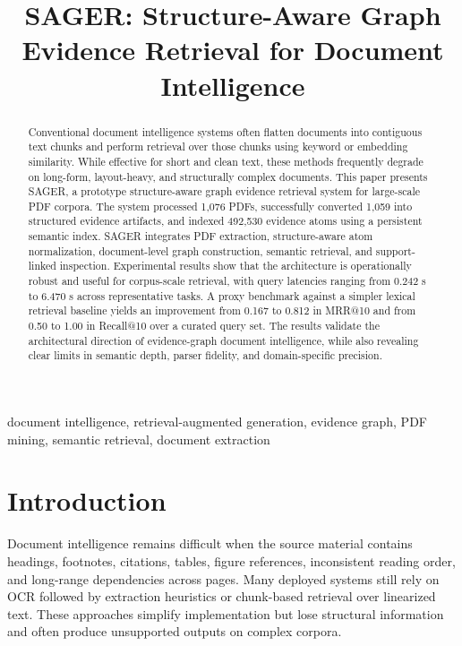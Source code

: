 \documentclass[conference]{IEEEtran}
\title{SAGER: Structure-Aware Graph Evidence Retrieval for Document Intelligence}
\author{
\IEEEauthorblockN{Meet Jethwa}
\IEEEauthorblockA{Independent Research / DocIntelligence Prototype\\
India\\
Email: meetjethwa3@gmail.com}
}
\begin{document}
\maketitle

\begin{abstract}
Conventional document intelligence systems often flatten documents into contiguous text chunks and perform retrieval over those chunks using keyword or embedding similarity. While effective for short and clean text, these methods frequently degrade on long-form, layout-heavy, and structurally complex documents. This paper presents SAGER, a prototype structure-aware graph evidence retrieval system for large-scale PDF corpora. The system processed 1,076 PDFs, successfully converted 1,059 into structured evidence artifacts, and indexed 492,530 evidence atoms using a persistent semantic index. SAGER integrates PDF extraction, structure-aware atom normalization, document-level graph construction, semantic retrieval, and support-linked inspection. Experimental results show that the architecture is operationally robust and useful for corpus-scale retrieval, with query latencies ranging from 0.242 s to 6.470 s across representative tasks. A proxy benchmark against a simpler lexical retrieval baseline yields an improvement from 0.167 to 0.812 in MRR@10 and from 0.50 to 1.00 in Recall@10 over a curated query set. The results validate the architectural direction of evidence-graph document intelligence, while also revealing clear limits in semantic depth, parser fidelity, and domain-specific precision.
\end{abstract}

\begin{IEEEkeywords}
document intelligence, retrieval-augmented generation, evidence graph, PDF mining, semantic retrieval, document extraction
\end{IEEEkeywords}

\section{Introduction}
Document intelligence remains difficult when the source material contains headings, footnotes, citations, tables, figure references, inconsistent reading order, and long-range dependencies across pages. Many deployed systems still rely on OCR followed by extraction heuristics or chunk-based retrieval over linearized text. These approaches simplify implementation but lose structural information and often produce unsupported outputs on complex corpora.
\end{document}
